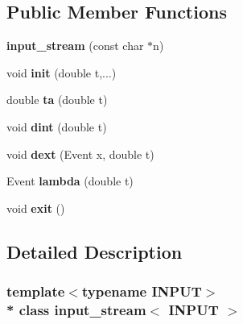 \subsection*{Public Member Functions}
\begin{DoxyCompactItemize}
\item 
{\bfseries input\+\_\+stream} (const char $\ast$n)\hypertarget{classinput__stream_ac5075c6ed0a87da7a096fd44cbc4d113}{}\label{classinput__stream_ac5075c6ed0a87da7a096fd44cbc4d113}

\item 
void {\bfseries init} (double t,...)\hypertarget{classinput__stream_a7080ba1b96056747cbd0f836b692e319}{}\label{classinput__stream_a7080ba1b96056747cbd0f836b692e319}

\item 
double {\bfseries ta} (double t)\hypertarget{classinput__stream_a2646cf888bb02ff289b99c473420c474}{}\label{classinput__stream_a2646cf888bb02ff289b99c473420c474}

\item 
void {\bfseries dint} (double t)\hypertarget{classinput__stream_a6587dc4c03edab458b160fa9e0fc26a9}{}\label{classinput__stream_a6587dc4c03edab458b160fa9e0fc26a9}

\item 
void {\bfseries dext} (Event x, double t)\hypertarget{classinput__stream_add1e66ac8a04594931a57387681e6131}{}\label{classinput__stream_add1e66ac8a04594931a57387681e6131}

\item 
Event {\bfseries lambda} (double t)\hypertarget{classinput__stream_ac4ba4f32f1d91c8790b087c3020a4ccf}{}\label{classinput__stream_ac4ba4f32f1d91c8790b087c3020a4ccf}

\item 
void {\bfseries exit} ()\hypertarget{classinput__stream_a74fc7095691b7da697d8008ea783ae23}{}\label{classinput__stream_a74fc7095691b7da697d8008ea783ae23}

\end{DoxyCompactItemize}


\subsection{Detailed Description}
\subsubsection*{template$<$typename I\+N\+P\+UT$>$\\*
class input\+\_\+stream$<$ I\+N\+P\+U\+T $>$}

